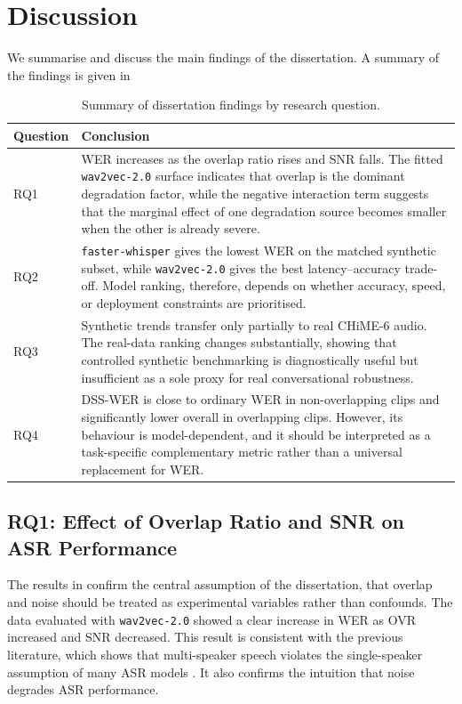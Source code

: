 \section{Discussion}
We summarise and discuss the main findings of the dissertation. A summary of the findings is given in 

\begin{table}[htbp]
\centering
\caption{Summary of dissertation findings by research question.}
\label{tab:discussion_rq_summary}
\small
\begin{tabularx}{\linewidth}{p{2.2cm}X}
\toprule
\textbf{Question} & \textbf{Conclusion} \\
\midrule
RQ1 & WER increases as the overlap ratio rises and SNR falls. The fitted \texttt{wav2vec-2.0} surface indicates that overlap is the dominant degradation factor, while the negative interaction term suggests that the marginal effect of one degradation source becomes smaller when the other is already severe. \\
RQ2 & \texttt{faster-whisper} gives the lowest WER on the matched synthetic subset, while \texttt{wav2vec-2.0} gives the best latency--accuracy trade-off. Model ranking, therefore, depends on whether accuracy, speed, or deployment constraints are prioritised. \\
RQ3 & Synthetic trends transfer only partially to real CHiME-6 audio. The real-data ranking changes substantially, showing that controlled synthetic benchmarking is diagnostically useful but insufficient as a sole proxy for real conversational robustness. \\
RQ4 & DSS-WER is close to ordinary WER in non-overlapping clips and significantly lower overall in overlapping clips. However, its behaviour is model-dependent, and it should be interpreted as a task-specific complementary metric rather than a universal replacement for WER. \\
\bottomrule
\end{tabularx}
\end{table}

\subsection{RQ1: Effect of Overlap Ratio and SNR on ASR Performance}
The results in  confirm the central assumption of the dissertation, that overlap and noise should be treated as experimental variables rather than confounds. The data evaluated with \texttt{wav2vec-2.0} showed a clear increase in WER as OVR increased and SNR decreased. This result is consistent with the previous literature, which shows that multi-speaker speech violates the single-speaker assumption of many ASR models \citep{galibert2013methodologies, chen2020continuousspeechseparationdataset, von_Neumann_2023}. It also confirms the intuition that noise degrades ASR performance. 

